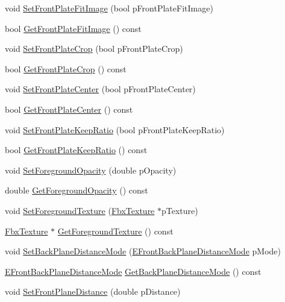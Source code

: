 \begin{DoxyCompactItemize}
void \hyperlink{class_fbx_camera_abecdf19fbd784cc116fe9ae2916cd3c7}{Set\+Front\+Plate\+Fit\+Image} (bool p\+Front\+Plate\+Fit\+Image)
\item 
bool \hyperlink{class_fbx_camera_a212030735f4c855c485659b5551b3d7f}{Get\+Front\+Plate\+Fit\+Image} () const
\item 
void \hyperlink{class_fbx_camera_abbd757d8635730909318bb9a7c5ec861}{Set\+Front\+Plate\+Crop} (bool p\+Front\+Plate\+Crop)
\item 
bool \hyperlink{class_fbx_camera_a3b5f0677c20c4e648342949b7bf5798f}{Get\+Front\+Plate\+Crop} () const
\item 
void \hyperlink{class_fbx_camera_a7401f702c8c08483a70c5080ff04f59a}{Set\+Front\+Plate\+Center} (bool p\+Front\+Plate\+Center)
\item 
bool \hyperlink{class_fbx_camera_a1ddaac65643a80442f19b5a330075903}{Get\+Front\+Plate\+Center} () const
\item 
void \hyperlink{class_fbx_camera_a8c39b7ce7738bf7b2ef6993ff45312f0}{Set\+Front\+Plate\+Keep\+Ratio} (bool p\+Front\+Plate\+Keep\+Ratio)
\item 
bool \hyperlink{class_fbx_camera_a35528b16d2cb6bfbc56883d08957003d}{Get\+Front\+Plate\+Keep\+Ratio} () const
\item 
void \hyperlink{class_fbx_camera_a73791e6dcfac8f1495c061cc572b3ef5}{Set\+Foreground\+Opacity} (double p\+Opacity)
\item 
double \hyperlink{class_fbx_camera_a21876836377a4b548df5e08c6afe8a17}{Get\+Foreground\+Opacity} () const
\item 
void \hyperlink{class_fbx_camera_a750d8a45be5fcaf020b6287ef9867f42}{Set\+Foreground\+Texture} (\hyperlink{class_fbx_texture}{Fbx\+Texture} $\ast$p\+Texture)
\item 
\hyperlink{class_fbx_texture}{Fbx\+Texture} $\ast$ \hyperlink{class_fbx_camera_a93ed0742bf378a047d77fa6daf8233ae}{Get\+Foreground\+Texture} () const
\item 
void \hyperlink{class_fbx_camera_a47cacdb816666eebadb56febbc3fa406}{Set\+Back\+Plane\+Distance\+Mode} (\hyperlink{class_fbx_camera_a79e74898d117e741c3fbd10b1ef21c79}{E\+Front\+Back\+Plane\+Distance\+Mode} p\+Mode)
\item 
\hyperlink{class_fbx_camera_a79e74898d117e741c3fbd10b1ef21c79}{E\+Front\+Back\+Plane\+Distance\+Mode} \hyperlink{class_fbx_camera_a862928086a5ae50086651ce6b96aa8c0}{Get\+Back\+Plane\+Distance\+Mode} () const
\item 
void \hyperlink{class_fbx_camera_ad86c6e9e2fa9c9fdabc0323d18ab9dee}{Set\+Front\+Plane\+Distance} (double p\+Distance)

\end{DoxyCompactItemize}
